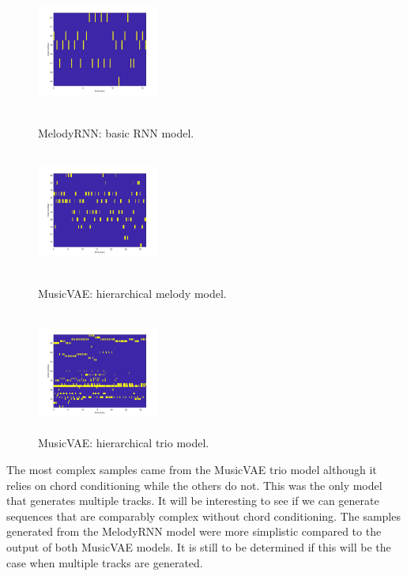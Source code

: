 \documentclass{article}
\begin{document}
\begin{figure}[htb!]
  \begin{minipage}{0.48\textwidth}
    \centering
    \includegraphics[height=4cm, width=4cm]{melody_rnn.png}
    \caption{MelodyRNN: basic RNN model.}
  \end{minipage}
  \begin{minipage}{0.48\textwidth}
    \centering
    \includegraphics[height=4cm, width=4cm]{musicvae_melody.png}
    \caption{MusicVAE: hierarchical melody model.}
  \end{minipage}\hfill
  \begin{minipage}{0.48\textwidth}
    \centering
    \includegraphics[height=4cm, width=4cm]{musicvae_trio.png}
    \caption{MusicVAE: hierarchical trio model.}
  \end{minipage}
\end{figure}

The most complex samples came from the MusicVAE trio model although it relies on chord conditioning while the others do not. This was the only model that generates multiple tracks. It will be interesting to see if we can generate sequences that are comparably complex without chord conditioning. The samples generated from the MelodyRNN model were more simplistic compared to the output of both MusicVAE models. It is still to be determined if this will be the case when multiple tracks are generated.
\end{document}
